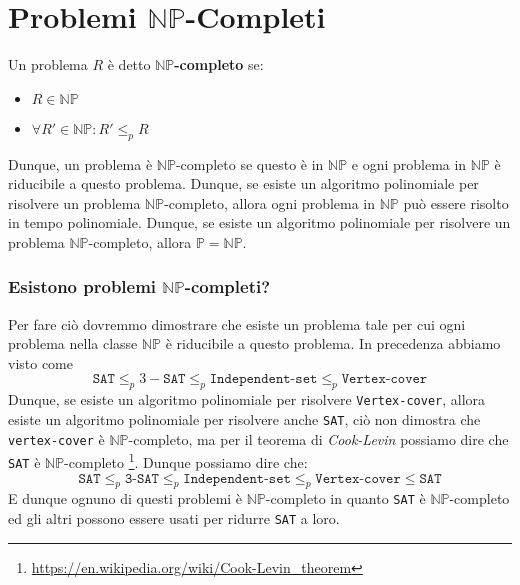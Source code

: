 \section{Problemi \texorpdfstring{$\mathbb{NP}$}{NP}-Completi}
    \begin{definition}
        Un problema $R$ è detto \textbf{$\mathbb{NP}$-completo} se:
        \begin{itemize}
            \item $R\in\mathbb{NP}$
            \item $\forall R'\in\mathbb{NP}: R'\leq_p R$
        \end{itemize}
    \end{definition}
    Dunque, un problema è $\mathbb{NP}$-completo se questo è in $\mathbb{NP}$ e ogni problema in $\mathbb{NP}$ è riducibile a questo problema. Dunque, se esiste un algoritmo polinomiale per risolvere un problema $\mathbb{NP}$-completo, allora ogni problema in $\mathbb{NP}$ può essere risolto in tempo polinomiale. Dunque, se esiste un algoritmo polinomiale per risolvere un problema $\mathbb{NP}$-completo, allora $\mathbb{P}=\mathbb{NP}$.
    \subsubsection{Esistono problemi $\mathbb{NP}$-completi?}
        Per fare ciò dovremmo dimostrare che esiste un problema tale per cui ogni problema nella classe $\mathbb{NP}$ è riducibile a questo problema. In precedenza abbiamo visto come
        $$
            \texttt{SAT} \leq_p 3-\texttt{SAT} \leq_p \texttt{Independent-set} \leq_p \texttt{Vertex-cover}
        $$
        Dunque, se esiste un algoritmo polinomiale per risolvere \texttt{Vertex-cover}, allora esiste un algoritmo polinomiale per risolvere anche \texttt{SAT}, ciò non dimostra che \texttt{vertex-cover} è $\mathbb{NP}$-completo, ma per il teorema di \textit{Cook-Levin} possiamo dire che \texttt{SAT} è $\mathbb{NP}$-completo \footnote{\url{https://en.wikipedia.org/wiki/Cook-Levin_theorem}}. Dunque possiamo dire che:
        $$
            \texttt{SAT} \leq_p \texttt{3-SAT} \leq_p \texttt{Independent-set} \leq_p \texttt{Vertex-cover} \leq \texttt{SAT}
        $$
        E dunque ognuno di questi problemi è $\mathbb{NP}$-completo in quanto \texttt{SAT} è $\mathbb{NP}$-completo ed gli altri possono essere usati per ridurre \texttt{SAT} a loro.\newline
